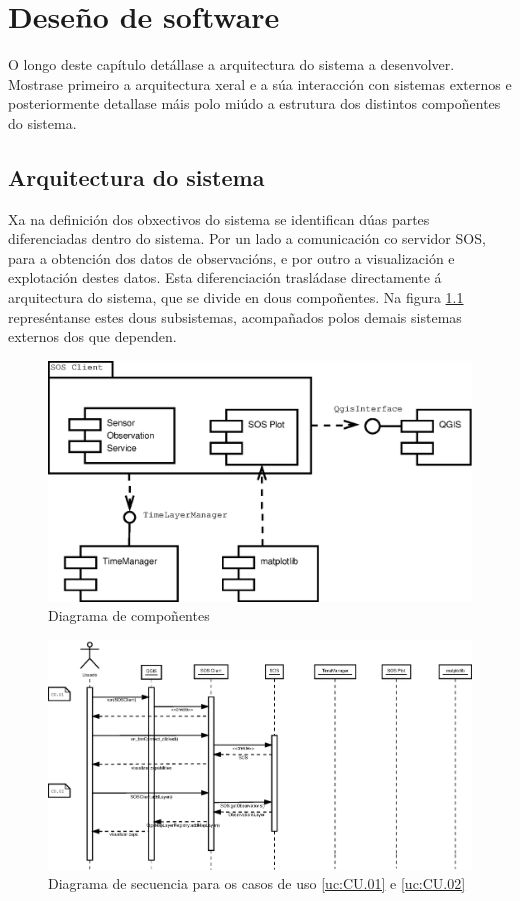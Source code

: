 \chapter{Deseño de software}
O longo deste capítulo detállase a arquitectura do sistema a desenvolver. Mostrase primeiro a arquitectura xeral e a súa interacción con sistemas externos e posteriormente detallase máis polo miúdo a estrutura dos distintos compoñentes do sistema.

\section{Arquitectura do sistema}
Xa na definición dos obxectivos do sistema se identifican dúas partes diferenciadas dentro do sistema. Por un lado a comunicación co servidor SOS, para a obtención dos datos de observacións, e por outro a visualización e explotación destes datos. Esta diferenciación trasládase directamente á arquitectura do sistema, que se divide en dous compoñentes. Na figura \ref{fig:diaComponentes} represéntanse estes dous subsistemas, acompañados polos demais sistemas externos dos que dependen.

\begin{figure}[hbtp]
 \centering
 \includegraphics[width=\textwidth]{images/componentes.eps}
 \caption{Diagrama de compoñentes}
 \label{fig:diaComponentes}
\end{figure}

\begin{figure}
 \centering
 \includegraphics[width=\textwidth]{images/seq1.eps}
 \caption{Diagrama de secuencia para os casos de uso \ref{uc:CU.01} e \ref{uc:CU.02}}
 \label{fig:diaSeq1}
\end{figure}

